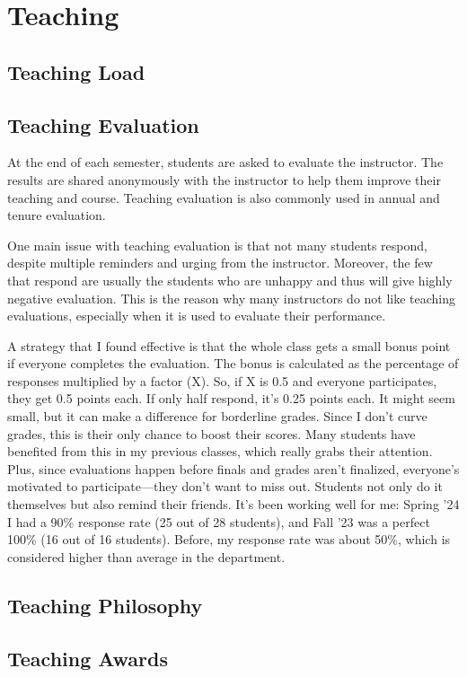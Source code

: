 \documentclass[oneside,11pt,dvipsnames]{book}
\begin{document}
\chapter{Teaching}
\section{Teaching Load}
\section{Teaching Evaluation}

At the end of each semester, students are asked to evaluate the instructor. The results are shared anonymously with the instructor to help them improve their teaching and course. Teaching evaluation is also commonly used in annual and tenure evaluation.

One main issue with teaching evaluation is that not many students respond, despite multiple reminders and urging from the instructor.  Moreover, the few that respond are usually the students who are unhappy and thus will give highly negative evaluation. This is the reason why many instructors do not like teaching evaluations, especially when it is used to evaluate their performance.


A strategy that I found effective is that the whole class gets a small bonus point if everyone completes the evaluation. The bonus is calculated as the percentage of responses multiplied by a factor (X). So, if X is 0.5 and everyone participates, they get 0.5 points each. If only half respond, it's 0.25 points each. It might seem small, but it can make a difference for borderline grades. Since I don't curve grades, this is their only chance to boost their scores. Many students have benefited from this in my previous classes, which really grabs their attention. Plus, since evaluations happen before finals and grades aren't finalized, everyone's motivated to participate—they don't want to miss out. Students not only do it themselves but also remind their friends. It's been working well for me: Spring '24 I had a 90\% response rate (25 out of 28 students), and Fall '23 was a perfect 100\% (16 out of 16 students). Before, my response rate was about 50\%, which is considered higher than average in the department.

\section{Teaching Philosophy}
\section{Teaching Awards}
\end{document}

